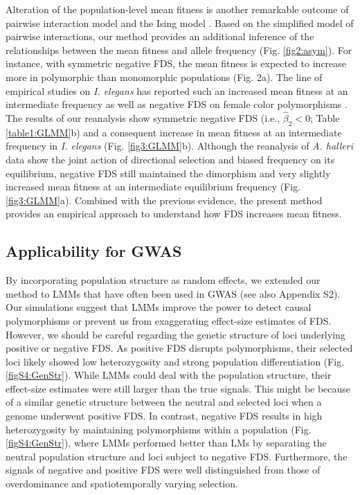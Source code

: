 \documentclass[12pt,]{article}
\begin{document}
Alteration of the population-level mean fitness is another remarkable outcome of pairwise interaction model \citep{cockerham1972frequency,asmussen_frequency-dependent_1990,schneider_maximization_2008,takahashi2018balanced} and the Ising model \citep{cipra1987introduction,sato2019neighbor}. Based on the simplified model of pairwise interactions, our method provides an additional inference of the relationships between the mean fitness and allele frequency (Fig. \ref{fig2:asym}). For instance, with symmetric negative FDS, the mean fitness is expected to increase more in polymorphic than monomorphic populations (Fig. 2a). The line of empirical studies on \textit{I. elegans} has reported such an increased mean fitness at an intermediate frequency \citep{takahashi2014evolution} as well as negative FDS on female color polymorphisms \citep{le2015evolutionary}. The results of our reanalysis show symmetric negative FDS (i.e., $\hat{\beta}_2<0$; Table \ref{table1:GLMM}b) and a consequent increase in mean fitness at an intermediate frequency in \textit{I. elegans} (Fig. \ref{fig3:GLMM}b). Although the reanalysis of \textit{A. halleri} data show the joint action of directional selection and biased frequency on its equilibrium, negative FDS still maintained the dimorphism and very slightly increased mean fitness at an intermediate equilibrium frequency (Fig. \ref{fig3:GLMM}a). Combined with the previous evidence, the present method provides an empirical approach to understand how FDS increases mean fitness.

\subsection{Applicability for GWAS}
By incorporating population structure as random effects, we extended our method to LMMs that have often been used in GWAS \citep{kang2008efficient} (see also Appendix S2). Our simulations suggest that LMMs improve the power to detect causal polymorphisms or prevent us from exaggerating effect-size estimates of FDS. However, we should be careful regarding the genetic structure of loci underlying positive or negative FDS. As positive FDS disrupts polymorphisms, their selected loci likely showed low heterozygosity and strong population differentiation (Fig. \ref{figS4:GenStr}). While LMMs could deal with the population structure, their effect-size estimates were still larger than the true signals. This might be because of a similar genetic structure between the neutral and selected loci when a genome underwent positive FDS. In contrast, negative FDS results in high heterozygosity by maintaining polymorphisms within a population (Fig. \ref{figS4:GenStr}), where LMMs performed better than LMs by separating the neutral population structure and loci subject to negative FDS. Furthermore, the signals of negative and positive FDS were well distinguished from those of overdominance and spatiotemporally varying selection.
\end{document}
